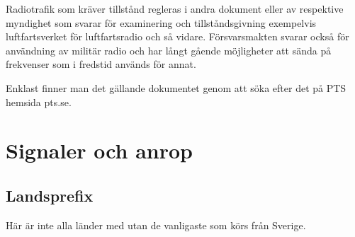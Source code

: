 Radiotrafik som kräver tillstånd regleras i andra dokument eller av respektive
myndighet som svarar för examinering och tillståndsgivning exempelvis
luftfartsverket för luftfartsradio och så vidare. Försvarsmakten svarar också
för användning av militär radio och har långt gående möjligheter att sända på
frekvenser som i fredstid används för annat.

Enklast finner man det gällande dokumentet genom att söka efter det på PTS
hemsida pts.se.

\section{Signaler och anrop}

\subsection{Landsprefix}

Här är inte alla länder med utan de vanligaste som körs från Sverige.

